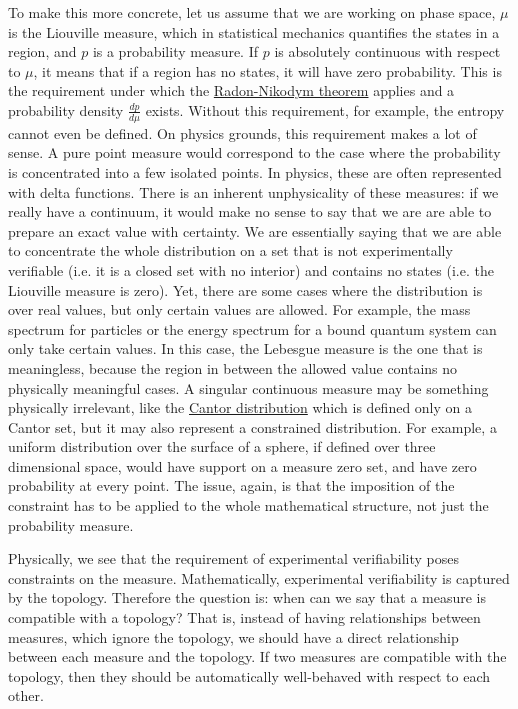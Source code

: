 To make this more concrete, let us assume that we are working on phase space, $\mu$ is the Liouville measure, which in statistical mechanics quantifies the states in a region, and $p$ is a probability measure. If $p$ is absolutely continuous with respect to $\mu$, it means that if a region has no states, it will have zero probability. This is the requirement under which the \href{https://en.wikipedia.org/wiki/Radon%E2%80%93Nikodym_theorem}{Radon-Nikodym theorem} applies and a probability density $\frac{dp}{d\mu}$ exists. Without this requirement, for example, the entropy cannot even be defined. On physics grounds, this requirement makes a lot of sense. A pure point measure would correspond to the case where the probability is concentrated into a few isolated points. In physics, these are often represented with delta functions. There is an inherent unphysicality of these measures: if we really have a continuum, it would make no sense to say that we are are able to prepare an exact value with certainty. We are essentially saying that we are able to concentrate the whole distribution on a set that is not experimentally verifiable (i.e. it is a closed set with no interior) and contains no states (i.e. the Liouville measure is zero). Yet, there are some cases where the distribution is over real values, but only certain values are allowed. For example, the mass spectrum for particles or the energy spectrum for a bound quantum system can only take certain values. In this case, the Lebesgue measure is the one that is meaningless, because the region in between the allowed value contains no physically meaningful cases. A singular continuous measure may be something physically irrelevant, like the \href{https://en.wikipedia.org/wiki/Cantor_distribution}{Cantor distribution} which is defined only on a Cantor set, but it may also represent a constrained distribution. For example, a uniform distribution over the surface of a sphere, if defined over three dimensional space, would have support on a measure zero set, and have zero probability at every point. The issue, again, is that the imposition of the constraint has to be applied to the whole mathematical structure, not just the probability measure.

Physically, we see that the requirement of experimental verifiability poses constraints on the measure. Mathematically, experimental verifiability is captured by the topology. Therefore the question is: when can we say that a measure is compatible with a topology? That is, instead of having relationships between measures, which ignore the topology, we should have a direct relationship between each measure and the topology. If two measures are compatible with the topology, then they should be automatically well-behaved with respect to each other.

